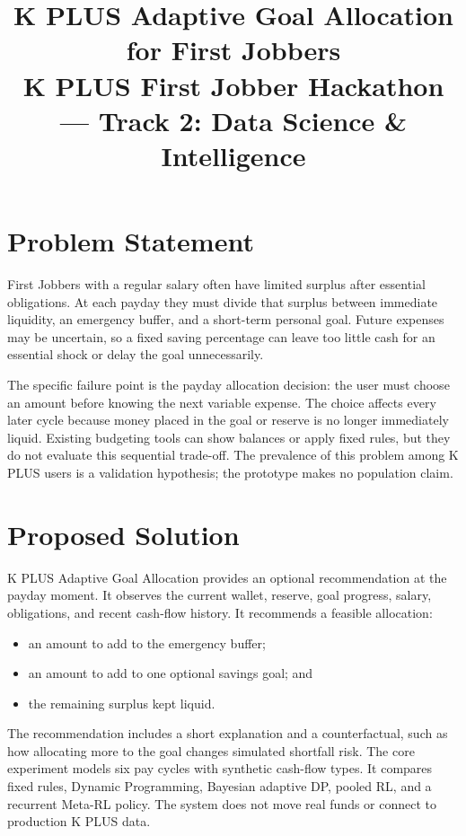 \documentclass[conference]{IEEEtran}
\begin{document}
\title{K PLUS Adaptive Goal Allocation for First Jobbers\\
{\footnotesize K PLUS First Jobber Hackathon --- Track 2: Data Science \& Intelligence}}

\author{}

\maketitle

\section{Problem Statement}
First Jobbers with a regular salary often have limited surplus after essential
obligations. At each payday they must divide that surplus between immediate
liquidity, an emergency buffer, and a short-term personal goal. Future
expenses may be uncertain, so a fixed saving percentage can leave too little
cash for an essential shock or delay the goal unnecessarily.

The specific failure point is the payday allocation decision: the user must
choose an amount before knowing the next variable expense. The choice affects
every later cycle because money placed in the goal or reserve is no longer
immediately liquid. Existing budgeting tools can show balances or apply fixed
rules, but they do not evaluate this sequential trade-off. The prevalence of
this problem among K PLUS users is a validation hypothesis; the prototype
makes no population claim.

\section{Proposed Solution}
K PLUS Adaptive Goal Allocation provides an optional recommendation at the
payday moment. It observes the current wallet, reserve, goal progress, salary,
obligations, and recent cash-flow history. It recommends a feasible allocation:
\begin{itemize}[noitemsep,topsep=1pt,leftmargin=*]
    \item an amount to add to the emergency buffer;
    \item an amount to add to one optional savings goal; and
    \item the remaining surplus kept liquid.
\end{itemize}
The recommendation includes a short explanation and a counterfactual, such as
how allocating more to the goal changes simulated shortfall risk. The core
experiment models six pay cycles with synthetic cash-flow types. It compares
fixed rules, Dynamic Programming, Bayesian adaptive DP, pooled RL, and a
recurrent Meta-RL policy. The system does not move real funds or connect to
production K PLUS data.
\end{document}
